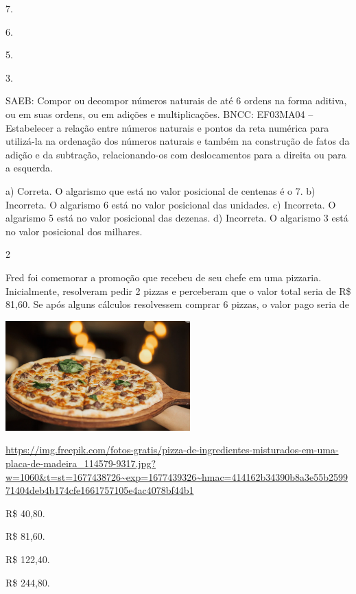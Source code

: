 {\begin{escolha}
{\begin{escolha}
\item
  7.
\item
  6.
\item
  5.
\item
  3.
\end{escolha}

SAEB: Compor ou decompor números naturais de até 6 ordens na forma aditiva, ou em suas ordens, ou em adições e multiplicações.
BNCC: EF03MA04 -- Estabelecer a relação entre números naturais e pontos da reta numérica para
utilizá-la na ordenação dos números naturais e também na construção de fatos da adição e da
subtração, relacionando-os com deslocamentos para a direita ou para a esquerda.

a) Correta. O algarismo que está no valor posicional de centenas é o 7.
b) Incorreta. O algarismo 6 está no valor posicional das unidades.
c) Incorreta. O algarismo 5 está no valor posicional das dezenas.
d) Incorreta. O algarismo 3 está no valor posicional dos milhares.

\num{2}

Fred foi comemorar a promoção que recebeu de seu chefe em uma pizzaria. Inicialmente, resolveram pedir 2 pizzas e perceberam que o valor total seria de R\$ 81,60. Se após alguns cálculos resolvessem comprar 6
pizzas, o valor pago seria de

\includegraphics[width=2.80000in,height=1.66867in]{media/image131.png}

\url{https://img.freepik.com/fotos-gratis/pizza-de-ingredientes-misturados-em-uma-placa-de-madeira_114579-9317.jpg?w=1060\&t=st=1677438726~exp=1677439326~hmac=414162b34390b8a3e55b259971404deb4b174cfe1661757105e4ac4078bf44b1}

\begin{escolha}

\item
  R\$ 40,80.
\item
  R\$ 81,60.
\item
  R\$ 122,40.
\item
  R\$ 244,80.
\end{escolha}

}
\end{escolha}}
